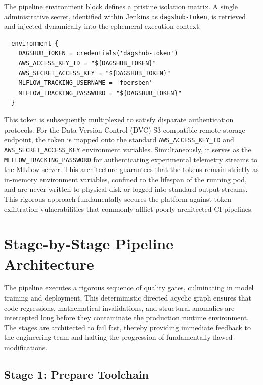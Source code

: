 The pipeline environment block defines a pristine isolation matrix. A single administrative secret, identified within Jenkins as \texttt{dagshub-token}, is retrieved and injected dynamically into the ephemeral execution context.

\begin{verbatim}
  environment {
    DAGSHUB_TOKEN = credentials('dagshub-token')
    AWS_ACCESS_KEY_ID = "${DAGSHUB_TOKEN}"
    AWS_SECRET_ACCESS_KEY = "${DAGSHUB_TOKEN}"
    MLFLOW_TRACKING_USERNAME = 'foersben'
    MLFLOW_TRACKING_PASSWORD = "${DAGSHUB_TOKEN}"
  }
\end{verbatim}

This token is subsequently multiplexed to satisfy disparate authentication protocols. For the Data Version Control (DVC) S3-compatible remote storage endpoint, the token is mapped onto the standard \texttt{AWS\_ACCESS\_KEY\_ID} and \texttt{AWS\_SECRET\_ACCESS\_KEY} environment variables. Simultaneously, it serves as the \texttt{MLFLOW\_TRACKING\_PASSWORD} for authenticating experimental telemetry streams to the MLflow server. This architecture guarantees that the tokens remain strictly as in-memory environment variables, confined to the lifespan of the running pod, and are never written to physical disk or logged into standard output streams. This rigorous approach fundamentally secures the platform against token exfiltration vulnerabilities that commonly afflict poorly architected CI pipelines.

\section{Stage-by-Stage Pipeline Architecture}
\label{sec:stage_architecture}

The pipeline executes a rigorous sequence of quality gates, culminating in model training and deployment. This deterministic directed acyclic graph ensures that code regressions, mathematical invalidations, and structural anomalies are intercepted long before they contaminate the production runtime environment. The stages are architected to fail fast, thereby providing immediate feedback to the engineering team and halting the progression of fundamentally flawed modifications.

\subsection{Stage 1: Prepare Toolchain}

